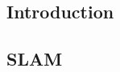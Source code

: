 \chapter{\chapslamtitle}

\section{Introduction}
\label{sec:chap3_intro}

\section{SLAM}
\label{sec:slam}




